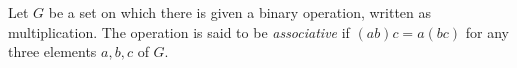 Let $G$ be a set on which there is given a binary operation, written as multiplication. The operation is said to be \textit{associative} if $(ab)c = a(bc)$ for any three elements $a, b, c$ of $G$.

